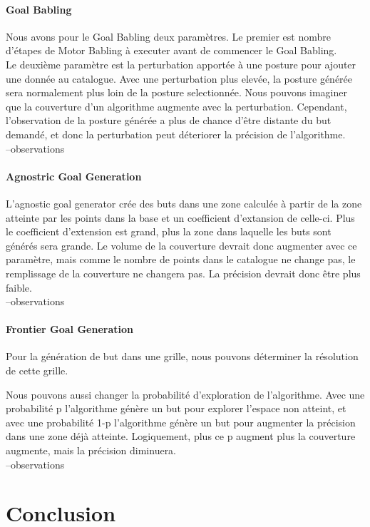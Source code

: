 \documentclass[11pt,french]{report}
\begin{document}
\subsubsection{Goal Babling}

Nous avons pour le Goal Babling deux paramètres. Le premier est nombre d'étapes de Motor Babling à executer avant de commencer le Goal Babling.\\
Le deuxième paramètre est la perturbation apportée à une posture pour ajouter une donnée au catalogue. Avec une perturbation plus elevée, la posture générée sera normalement plus loin de la posture selectionnée. Nous pouvons imaginer que la couverture d'un algorithme augmente avec la perturbation. Cependant, l'observation de la posture générée a plus de chance d'être distante du but demandé, et donc la perturbation peut déteriorer la précision de l'algorithme.\\
--observations

\subsubsection{Agnostric Goal Generation}

L'agnostic goal generator crée des buts dans une zone calculée à partir de la zone atteinte par les points dans la base et un coefficient d'extansion de celle-ci. Plus le coefficient d'extension est grand, plus la zone dans laquelle les buts sont générés sera grande. Le volume de la couverture devrait donc augmenter avec ce paramètre, mais comme le nombre de points dans le catalogue ne change pas, le remplissage de la couverture ne changera pas. La précision devrait donc être plus faible.\\
--observations

\subsubsection{Frontier Goal Generation}

Pour la génération de but dans une grille, nous pouvons déterminer la résolution de cette grille.

Nous pouvons aussi changer la probabilité d'exploration de l'algorithme. Avec une probabilité p l'algorithme génère un but pour explorer l'espace non atteint, et avec une probabilité 1-p l'algorithme génère un but pour augmenter la précision dans une zone déjà atteinte. Logiquement, plus ce p augment plus la couverture augmente, mais la précision diminuera.\\
--observations

\chapter{Conclusion}
\end{document}

